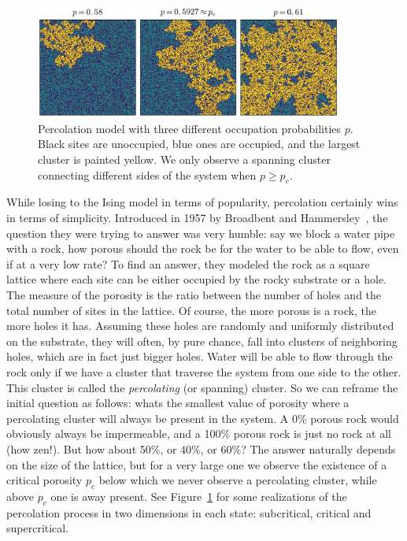 \begin{figure}[b]
\begin{center}
    \includegraphics[width=0.9\textwidth]{chapters/ch2-crit/figs/isoperco}
\end{center}
\caption{Percolation model with three
    different occupation probabilities $p$. Black sites are unoccupied, blue
    ones are occupied, and the largest cluster is painted yellow. 
    We only observe a spanning cluster connecting different sides of the system
    when $p\geq p_c$.}
\label{fig:isoperco}
\end{figure}

While losing to the Ising model in terms of popularity, percolation certainly
wins in terms of simplicity. Introduced in 1957 by Broadbent and
Hammersley~\cite{Broadbent1957}, the question they were trying to answer was
very humble: say we block a water pipe with a rock, how porous should the rock
be for the water to be able to flow, even if at a very low rate? To find
an answer, they modeled the rock as a square lattice where each site can be
either occupied by the rocky substrate or a hole. The measure of the porosity
is the ratio between the number of holes and the total number of sites in the
lattice. Of course, the more porous is a rock, the more holes it has. Assuming
these holes are randomly and uniformly distributed on the substrate, they will
often, by pure chance, fall into clusters of neighboring holes, which are in
fact just bigger holes. Water will be able to flow through the rock only if we
have a cluster that traverse the system from one side to the other. This
cluster is called the \textit{percolating} (or spanning) cluster. So we can
reframe the initial question as follows: whats the smallest value of porosity
where a percolating cluster will always be present in the system. A 0\% porous
rock would obviously always be impermeable, and a 100\% porous rock is just no
rock at all (how zen!). But how about 50\%, or 40\%, or 60\%? The answer
naturally depends on the size of the lattice, but for a very large one we
observe the existence of a critical porosity $p_c$ below which we never observe
a percolating cluster, while above $p_c$ one is away present. See
Figure~\ref{fig:isoperco} for some realizations of the percolation process
in two dimensions in each state: subcritical, critical and supercritical.

